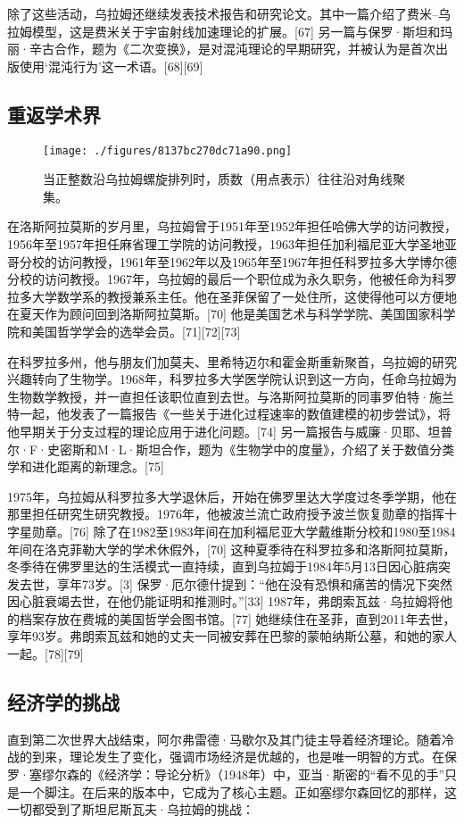 除了这些活动，乌拉姆还继续发表技术报告和研究论文。其中一篇介绍了费米–乌拉姆模型，这是费米关于宇宙射线加速理论的扩展。[67] 另一篇与保罗·斯坦和玛丽·辛古合作，题为《二次变换》，是对混沌理论的早期研究，并被认为是首次出版使用‘混沌行为’这一术语。[68][69]
\subsection{重返学术界}
\begin{figure}[ht]
\centering
\texttt{[image: ./figures/8137bc270dc71a90.png]}
\caption{当正整数沿乌拉姆螺旋排列时，质数（用点表示）往往沿对角线聚集。} \label{fig_Ulam_8}
\end{figure}
在洛斯阿拉莫斯的岁月里，乌拉姆曾于1951年至1952年担任哈佛大学的访问教授，1956年至1957年担任麻省理工学院的访问教授，1963年担任加利福尼亚大学圣地亚哥分校的访问教授，1961年至1962年以及1965年至1967年担任科罗拉多大学博尔德分校的访问教授。1967年，乌拉姆的最后一个职位成为永久职务，他被任命为科罗拉多大学数学系的教授兼系主任。他在圣菲保留了一处住所，这使得他可以方便地在夏天作为顾问回到洛斯阿拉莫斯。[70] 他是美国艺术与科学学院、美国国家科学院和美国哲学学会的选举会员。[71][72][73]

在科罗拉多州，他与朋友们加莫夫、里希特迈尔和霍金斯重新聚首，乌拉姆的研究兴趣转向了生物学。1968年，科罗拉多大学医学院认识到这一方向，任命乌拉姆为生物数学教授，并一直担任该职位直到去世。与洛斯阿拉莫斯的同事罗伯特·施兰特一起，他发表了一篇报告《一些关于进化过程速率的数值建模的初步尝试》，将他早期关于分支过程的理论应用于进化问题。[74] 另一篇报告与威廉·贝耶、坦普尔·F·史密斯和M·L·斯坦合作，题为《生物学中的度量》，介绍了关于数值分类学和进化距离的新理念。[75]

1975年，乌拉姆从科罗拉多大学退休后，开始在佛罗里达大学度过冬季学期，他在那里担任研究生研究教授。1976年，他被波兰流亡政府授予波兰恢复勋章的指挥十字星勋章。[76] 除了在1982至1983年间在加利福尼亚大学戴维斯分校和1980至1984年间在洛克菲勒大学的学术休假外，[70] 这种夏季待在科罗拉多和洛斯阿拉莫斯，冬季待在佛罗里达的生活模式一直持续，直到乌拉姆于1984年5月13日因心脏病突发去世，享年73岁。[3] 保罗·厄尔德什提到：“他在没有恐惧和痛苦的情况下突然因心脏衰竭去世，在他仍能证明和推测时。”[33] 1987年，弗朗索瓦兹·乌拉姆将他的档案存放在费城的美国哲学会图书馆。[77] 她继续住在圣菲，直到2011年去世，享年93岁。弗朗索瓦兹和她的丈夫一同被安葬在巴黎的蒙帕纳斯公墓，和她的家人一起。[78][79]
\subsection{经济学的挑战}  
直到第二次世界大战结束，阿尔弗雷德·马歇尔及其门徒主导着经济理论。随着冷战的到来，理论发生了变化，强调市场经济是优越的，也是唯一明智的方式。在保罗·塞缪尔森的《经济学：导论分析》（1948年）中，亚当·斯密的“看不见的手”只是一个脚注。在后来的版本中，它成为了核心主题。正如塞缪尔森回忆的那样，这一切都受到了斯坦尼斯瓦夫·乌拉姆的挑战：

